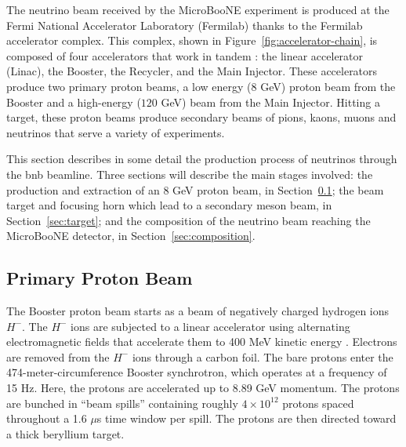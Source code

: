 The neutrino beam received by the MicroBooNE experiment is produced at the Fermi National Accelerator Laboratory (Fermilab) thanks to the Fermilab accelerator complex.
This complex, shown in Figure~\ref{fig:accelerator-chain}, is composed of four accelerators that work in tandem \cite{doe}: the linear accelerator (Linac), the Booster, the Recycler, and the Main Injector. These accelerators produce two primary proton beams, a low energy ($8$ GeV) proton beam from the Booster and a high-energy ($120$ GeV) beam from the Main Injector. Hitting a target, these proton beams produce secondary beams of pions, kaons, muons and neutrinos that serve a variety of experiments.
 
This section describes in some detail the production process of neutrinos through the \acrshort{bnb} beamline. Three sections will describe the main stages involved: the production and extraction of an 8 GeV proton beam, in Section~\ref{sec:beam}; the beam target and focusing horn which lead to a secondary meson beam, in Section~\ref{sec:target}; and the composition of the neutrino beam reaching the MicroBooNE detector, in Section~\ref{sec:composition}.



\subsection{Primary Proton Beam}
\label{sec:beam}

The Booster proton beam starts as a beam of negatively charged hydrogen ions $H^-$. The  $H^-$ ions are subjected to a linear accelerator using alternating electromagnetic fields that accelerate them to 400 MeV kinetic energy \cite{miniboone_flux}.
Electrons are removed from the $H^-$ ions through a carbon foil. The bare protons enter the 474-meter-circumference Booster synchrotron, which operates at a frequency of 15 Hz. Here, the protons are accelerated up to 8.89 GeV momentum. The protons are bunched in ``beam spills'' containing roughly $4 \times 10^{12}$ protons spaced throughout a 1.6 $\mu$s time window per spill. The protons are then directed toward a thick beryllium target.


